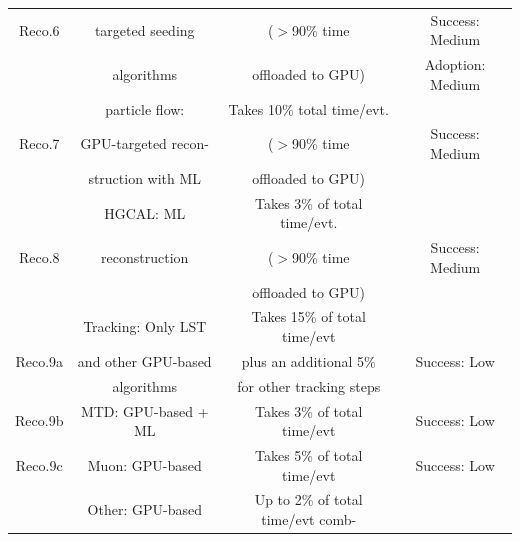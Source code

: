 \begin{table}[tbph]
\begin{tabular}{|c|c|c|c|}
    Reco.6    & targeted seeding                 & {($>$90\% time }                                  & Success: Medium \\
    \cellcolor{tablerowheader}
              & algorithms                       & offloaded to GPU)                         & Adoption: Medium \\ \hline
    \cellcolor{tablerowheader}
              & particle flow:                   &  {Takes 10\% total time/evt.}                     &                  \\
    \cellcolor{tablerowheader}
    Reco.7    & GPU-targeted recon-        &    {($>$90\% time }                               & Success: Medium  \\
    \cellcolor{tablerowheader}
              & struction with ML          &   offloaded to GPU)                       &                  \\ \hline
    \cellcolor{tablerowheader}
              &  HGCAL: ML           &  Takes 3\% of total time/evt.                     &                  \\
    \cellcolor{tablerowheader}
    Reco.8    &  reconstruction                  &  {($>$90\% time }                                 &  Success: Medium \\
    \cellcolor{tablerowheader}
              &                                  &    offloaded to GPU)                      &                  \\ \hline
    \cellcolor{tablerowheader}
              &  Tracking: Only LST        & Takes 15\% of total time/evt    &               \\ 
    \cellcolor{tablerowheader}
    Reco.9a   &  and other GPU-based       &  plus an additional 5\%                           &  Success: Low    \\
    \cellcolor{tablerowheader}    
              & algorithms                       &  for other tracking steps                         &                  \\\hline
    \cellcolor{tablerowheader}    
    Reco.9b   & MTD: GPU-based + ML &  Takes 3\% of total time/evt                      & Success: Low     \\\hline
    \cellcolor{tablerowheader}
    Reco.9c   & Muon: GPU-based            & Takes 5\% of total time/evt                       & Success: Low     \\\hline
    \cellcolor{tablerowheader}
              & Other: GPU-based           & Up to 2\% of total time/evt comb-                 &                  \\  

\end{tabular}
\end{table}
